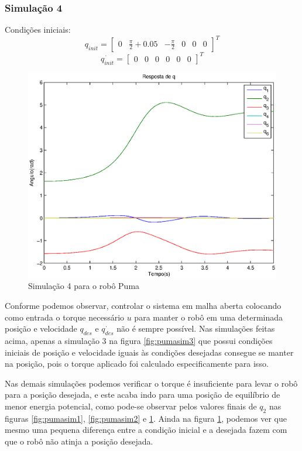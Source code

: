 \documentclass{article}
\begin{document}
\subsubsection{Simulação 4}
Condições iniciais:
\begin{equation}
\label{eq:sim4q}
q_{init}=\begin{bmatrix}
0 & \frac{\pi}{2}+0.05 & -\frac{\pi}{2} & 0 & 0 & 0
\end{bmatrix}^T
\end{equation}
\begin{equation}
\label{eq:sim4qd}
\dot{q_{init}}=\begin{bmatrix}
0 & 0 & 0 & 0 & 0 & 0
\end{bmatrix}^T
\end{equation}

\begin{figure}[H]
	\centering
	\includegraphics[width=0.8\linewidth]{../sim4ode}
	\caption{Simulação 4 para o robô Puma}
	\label{fig:pumasim4}
\end{figure}

Conforme podemos observar, controlar o sistema em malha aberta colocando como entrada o torque necessário $u$ para manter o robô em uma determinada posição e velocidade $q_{des}$ e $\dot{q_{des}}$ não é sempre possível. Nas simulações feitas acima, apenas a simulação 3 na figura \ref{fig:pumasim3} que possui condições iniciais de posição e velocidade iguais às condições desejadas consegue se manter na posição, pois o torque aplicado foi calculado especificamente para isso. 

Nas demais simulações podemos verificar o torque é insuficiente para levar o robô para a posição desejada, e este acaba indo para uma posição de equilíbrio de menor energia potencial, como pode-se observar pelos valores finais de $q_2$ nas figuras \ref{fig:pumasim1}, \ref{fig:pumasim2} e \ref{fig:pumasim4}. Ainda na figura \ref{fig:pumasim4}, podemos ver que mesmo uma pequena diferença entre a condição inicial e a desejada fazem com que o robô não atinja a posição desejada.
\end{document}
